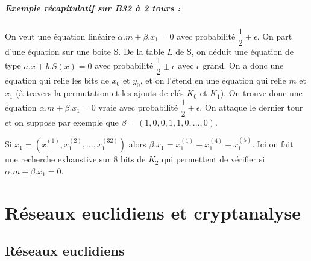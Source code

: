\documentclass[12pt,a4paper]{report}
\begin{document}
\paragraph{Exemple récapitulatif sur B32 à 2 tours :\\}
\begin{center}
  \scalebox{0.4}{}	
\end{center}
On veut une équation linéaire $\alpha.m+\beta.x_1=0$ avec probabilité $\dfrac{1}{2} \pm \epsilon $. On part d'une équation sur une boite S. 
De la table $L$ de S, on déduit une équation de type $a.x+b.S(x) =0$ avec probabilité $\dfrac{1}{2} \pm \epsilon$ avec $\epsilon$ grand. On a donc une équation qui relie les bits de $x_0$ et $y_0$, et on l'étend en une équation qui relie $m$ et $x_1$ (à travers la permutation et les ajouts de clés $K_0$ et $K_1$). On trouve donc une équation $\alpha.m + \beta.x_1=0$ vraie avec probabilité $\dfrac{1}{2} \pm \epsilon $. On attaque le dernier tour et on suppose par exemple que $\beta=(1,0,0,1,1,0,\ldots,0)$.
\begin{center}
  \scalebox{0.8}{}	
\end{center}
Si $x_1 = \left(x_1^{(1)},x_1^{(2)},\ldots,x_1^{(32)}\right)$ alors $\beta.x_1 = x_1^{(1)} + x_1^{(4)} + x_1^{(5)}$. Ici on fait une recherche exhaustive sur 8 bits de $K_2$ qui permettent de vérifier si $\alpha.m+\beta.x_1 = 0$.

\chapter{Réseaux euclidiens et cryptanalyse}
\section{Réseaux euclidiens}
\end{document}
